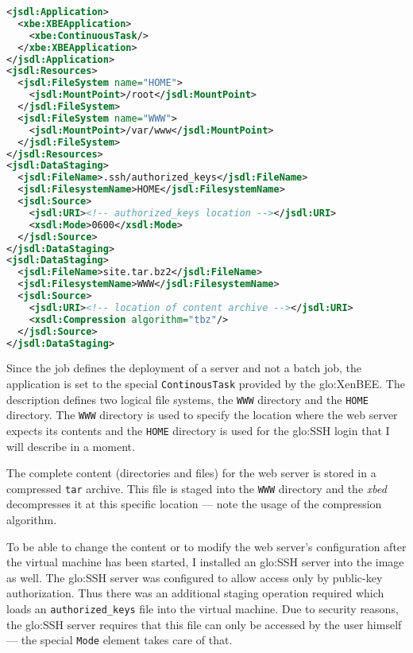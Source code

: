 \begin{center}
  \begin{minipage}{.9\textwidth}
    \begin{lstlisting}[captionpos=b,backgroundcolor=\color{listingcolor},frame=lines,numbers=none,stepnumber=5,numberfirstline=false,numberstyle=\tiny,caption={File
      system definitions for a web server deployment.},label={lst:result:web-server},language=XML]
<jsdl:Application>
  <xbe:XBEApplication>
    <xbe:ContinuousTask/>
  </xbe:XBEApplication>
</jsdl:Application>
<jsdl:Resources>
  <jsdl:FileSystem name="HOME">
    <jsdl:MountPoint>/root</jsdl:MountPoint>
  </jsdl:FileSystem>
  <jsdl:FileSystem name="WWW">
    <jsdl:MountPoint>/var/www</jsdl:MountPoint>
  </jsdl:FileSystem>
</jsdl:Resources>
<jsdl:DataStaging>
  <jsdl:FileName>.ssh/authorized_keys</jsdl:FileName>
  <jsdl:FilesystemName>HOME</jsdl:FilesystemName>
  <jsdl:Source>
    <jsdl:URI><!-- authorized_keys location --></jsdl:URI>
    <xsdl:Mode>0600</xsdl:Mode>
  </jsdl:Source>
</jsdl:DataStaging>
<jsdl:DataStaging>
  <jsdl:FileName>site.tar.bz2</jsdl:FileName>
  <jsdl:FilesystemName>WWW</jsdl:FilesystemName>
  <jsdl:Source>
    <jsdl:URI><!-- location of content archive --></jsdl:URI>
    <xsdl:Compression algorithm="tbz"/>
  </jsdl:Source>
</jsdl:DataStaging>
    \end{lstlisting}
  \end{minipage}
\end{center}

Since the job defines the deployment of  a server and not a batch job, the
application is  set to the special \texttt{ContinousTask}  provided by the
\gls{glo:XenBEE}. The  description defines  two logical file  systems, the
\texttt{WWW} directory and  the \texttt{HOME} directory.  The \texttt{WWW}
directory is used to specify the location where the web server expects its
contents  and the \texttt{HOME}  directory is  used for  the \gls{glo:SSH}
login that I will describe in a moment.

The complete  content (\ie  directories and files)  for the web  server is
stored in a compressed \texttt{tar}  archive. This file is staged into the
\texttt{WWW}  directory  and  the  \emph{xbed}  decompresses  it  at  this
specific location --- note the usage of the compression algorithm.

To  be  able  to  change  the  content  or  to  modify  the  web  server's
configuration after the  virtual machine has been started,  I installed an
\gls{glo:SSH} server into the image as well.  The \gls{glo:SSH} server was
configured to  allow access only by public-key  authorization.  Thus there
was   an   additional   staging   operation  required   which   loads   an
\texttt{authorized\_keys} file into the  virtual machine.  Due to security
reasons,  the \gls{glo:SSH}  server requires  that this  file can  only be
accessed by the  user himself --- the special  \texttt{Mode} element takes
care of that.

